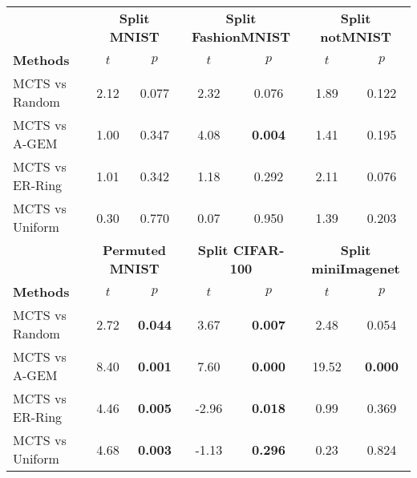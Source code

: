 \begin{tabular}{lcccccc}
\toprule
                   & \multicolumn{2}{c}{\textbf{Split MNIST}} & \multicolumn{2}{c}{\textbf{Split FashionMNIST}} & \multicolumn{2}{c}{\textbf{Split notMNIST}} \\
\cmidrule(lr){2-3} \cmidrule(lr){4-5} \cmidrule(lr){6-7}
\textbf{Methods}   & $t$                 & $p$                    & $t$                    & $p$                        & $t$                  & $p$                      \\ \midrule
MCTS vs Random     & 2.12            & 0.077           & 2.32               & 0.076               & 1.89             & 0.122             \\
MCTS vs A-GEM      & 1.00            & 0.347           & 4.08               & \textbf{0.004}               & 1.41             & 0.195             \\
MCTS vs ER-Ring    & 1.01            & 0.342           & 1.18               & 0.292               & 2.11             & 0.076             \\
MCTS vs Uniform & 0.30            & 0.770           & 0.07               & 0.950               & 1.39             & 0.203            \\
\bottomrule \toprule
                   & \multicolumn{2}{c}{\textbf{Permuted MNIST}} & \multicolumn{2}{c}{\textbf{Split CIFAR-100}} & \multicolumn{2}{c}{\textbf{Split miniImagenet}} \\
\cmidrule(lr){2-3} \cmidrule(lr){4-5} \cmidrule(lr){6-7}
\textbf{Methods}   & $t$                  & $p$                      & $t$                   & $p$                      & $t$                     & $p$                       \\ \midrule
MCTS vs Random     & 2.72             & \textbf{0.044}             & 3.67              & \textbf{0.007}             & 2.48                & 0.054              \\
MCTS vs A-GEM      & 8.40             & \textbf{0.001}             & 7.60              & \textbf{0.000}             & 19.52               & \textbf{0.000}              \\
MCTS vs ER-Ring    & 4.46             & \textbf{0.005}             & -2.96             & \textbf{0.018}             & 0.99                & 0.369              \\
MCTS vs Uniform & 4.68             & \textbf{0.003}             & -1.13             & \textbf{0.296}             & 0.23                & 0.824             \\
\bottomrule
\end{tabular}